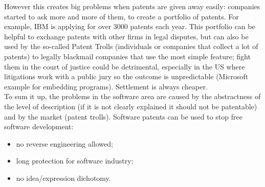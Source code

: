 \documentclass[a4paper, 10pt, titlepage]{article}
\begin{document}
However this creates big problems when patents are given away easily: companies started to ask more and more of them, to create a portfolio of patents. For example, IBM is applying for over 3000 patents each year. This portfolio can be helpful to exchange patents with other firms in legal disputes, but can also be used by the so-called Patent Trolls (individuals or companies that collect a lot of patents) to legally blackmail companies that use the most simple feature; fight them in the court of justice could be detrimental, especially in the US where litigations work with a public jury so the outcome is unpredictable (Microsoft example for embedding programs). Settlement is always cheaper. \medskip\\
To sum it up, the problems in the software area are caused by the abstractness of the level of description (if it is not clearly explained it should not be patentable) and by the market (patent trolls). Software patents can be used to stop free software development:
\begin{itemize}
\item no reverse engineering allowed;
\item long protection for software industry;
\item no idea/expression dichotomy.
\end{itemize}
\end{document}
